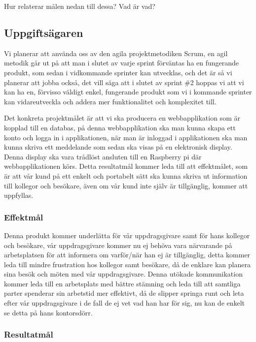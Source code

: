 \documentclass[11pt]{article}
\begin{document}
Hur relaterar målen nedan till dessa? Vad är vad?

\subsection{Uppgiftsägaren}
\label{sec:orgd3f752b}
Vi planerar att använda oss av den agila projektmetodiken Scrum, en agil
metodik går ut på att man i slutet av varje sprint förväntas ha en
fungerande produkt, som sedan i vidkommande sprinter kan utvecklas, och
det är så vi planerar att jobba också, det vill säga att i slutet av
sprint \#2 hoppas vi att vi kan ha en, förvisso väldigt enkel, fungerande
produkt som vi i kommande sprinter kan vidareutveckla och addera mer
funktionalitet och komplexitet till.

Det konkreta projektmålet är att vi ska producera en webbapplikation som
är kopplad till en databas, på denna webbapplikation ska man kunna skapa
ett konto och logga in i applikationen, när man är inloggad i
applikationen ska man kunna skriva ett meddelande som sedan ska visas på
en elektronisk display. Denna display ska vara trådlöst ansluten till en
Raspberry pi där webbapplikationen körs. Detta resultatmål kommer leda
till att effektmålet, som är att vår kund på ett enkelt och portabelt
sätt ska kunna skriva ut information till kollegor och besökare, även om
vår kund inte själv är tillgänglig, kommer att uppfyllas.

\subsubsection{Effektmål}
\label{sec:org8a5fcc1}

Denna produkt kommer underlätta för vår uppdragsgivare samt för hans
kollegor och besökare, vår uppdragsgivare kommer nu ej behöva vara
närvarande på arbetsplatsen för att informera om varför/när han ej är
tillgänglig, detta kommer leda till mindre frustration hos kollegor samt
besökare, då de enklare kan planera sina besök och möten med vår
uppdragsgivare. Denna utökade kommunikation kommer leda till en
arbetsplats med bättre stämning och leda till att samtliga parter
spenderar sin arbetstid mer effektivt, då de slipper springa runt och
leta efter vår uppdragsgivare i de fall de ej vet vad han har för sig,
nu kan de enkelt se detta på hans kontorsdörr.

\subsubsection{Resultatmål}
\label{sec:orge45f156}
\end{document}
